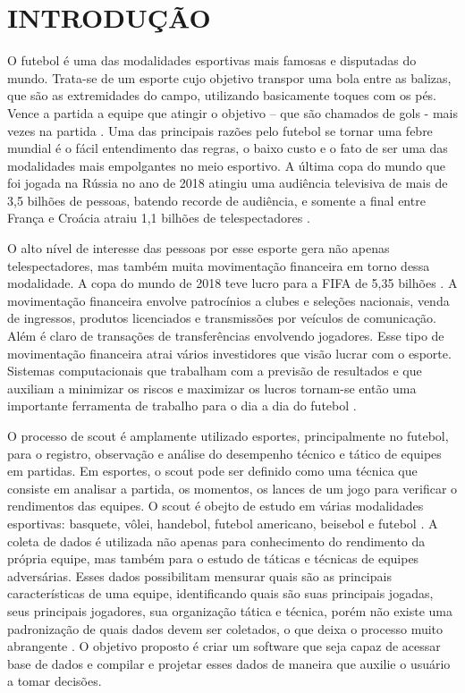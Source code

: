 \newpage
\section{INTRODUÇÃO}
O futebol é uma das modalidades esportivas mais famosas e disputadas do mundo. Trata-se de um esporte cujo objetivo transpor uma bola entre as balizas, que são as extremidades do campo, utilizando basicamente toques com os pés. Vence a partida a equipe que atingir o objetivo – que são chamados de gols - mais vezes na partida \cite{Sfeir2011}. Uma das principais razões pelo futebol se tornar uma febre mundial é o fácil entendimento das regras, o baixo custo e o fato de ser uma das modalidades mais empolgantes no meio esportivo. A última copa do mundo que foi jogada na Rússia no ano de 2018 atingiu uma audiência televisiva de mais de 3,5 bilhões de pessoas, batendo recorde de audiência, e somente a final entre França e Croácia atraiu 1,1 bilhões de telespectadores \cite{Chade2018}.

O alto nível de interesse das pessoas por esse esporte gera não apenas telespectadores, mas também muita movimentação financeira em torno dessa modalidade. A copa do mundo de 2018 teve lucro para a FIFA de 5,35 bilhões \cite{FIFA2018}. A movimentação financeira envolve patrocínios a clubes e seleções nacionais, venda de ingressos, produtos licenciados e transmissões por veículos de comunicação. Além é claro de transações de transferências envolvendo jogadores. Esse tipo de movimentação financeira atrai vários investidores que visão lucrar com o esporte. Sistemas computacionais que trabalham com a previsão de resultados e que auxiliam a minimizar os riscos e maximizar os lucros tornam-se então uma importante ferramenta de trabalho para o dia a dia do futebol \cite{Perin2013}.

O processo de scout é amplamente utilizado esportes, principalmente no futebol, para o registro, observação e análise do desempenho técnico e tático de equipes em partidas. Em esportes, o scout pode ser definido como uma técnica que consiste em analisar a partida, os momentos, os lances de um jogo para verificar o rendimentos das equipes. O scout é obejto de estudo em várias modalidades esportivas: basquete, vôlei, handebol, futebol americano, beisebol e futebol \cite{Martins2017}. A coleta de dados é utilizada não apenas para conhecimento do rendimento da própria equipe, mas também para o estudo de táticas e técnicas de equipes adversárias. Esses dados possibilitam mensurar quais são as principais características de uma equipe, identificando quais são suas principais jogadas, seus principais jogadores, sua organização tática e técnica, porém não existe uma padronização de quais dados devem ser coletados, o que deixa o processo muito abrangente \cite{Duarte2015}. O objetivo proposto é criar um software que seja capaz de acessar base de dados e compilar e projetar esses dados de maneira que auxilie o usuário a tomar decisões.


